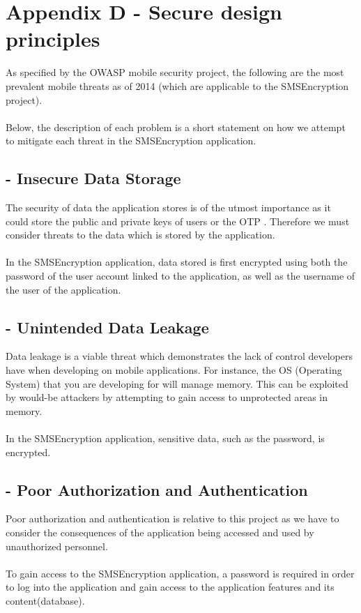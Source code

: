 \section{Appendix D - Secure design principles}
As specified by the OWASP mobile security project, the following are the most prevalent mobile threats as of 2014 (which are applicable to the SMSEncryption project).\\
\textbf{\\}
Below, the description of each problem is a short statement on how we attempt to mitigate each threat in the SMSEncryption application.
\subsection*{ - Insecure Data Storage}
The security of data the application stores is of the utmost importance as it could store the public and private keys of users or the OTP . Therefore we must consider threats to the data which is stored by the application. \\
\textbf{\\}
In the SMSEncryption application, data stored is first encrypted using both the password of the user account linked to the application, as well as the username of the user of the application.
\subsection*{ - Unintended Data Leakage}
Data leakage is a viable threat which demonstrates the lack of control developers have when developing on mobile applications. For instance, the OS (Operating System) that you are developing for will manage memory. This can be exploited by would-be attackers by attempting to gain access to unprotected areas in memory.\\
\textbf{\\}
In the SMSEncryption application, sensitive data, such as the password, is encrypted.
\subsection*{ - Poor Authorization and Authentication}
Poor authorization and authentication is relative to this project as we have to consider the consequences of the application being accessed and used by unauthorized personnel.\\
\textbf{\\}
To gain access to the SMSEncryption application, a password is required in order to log into the application and gain access to the application features and its content(database).
